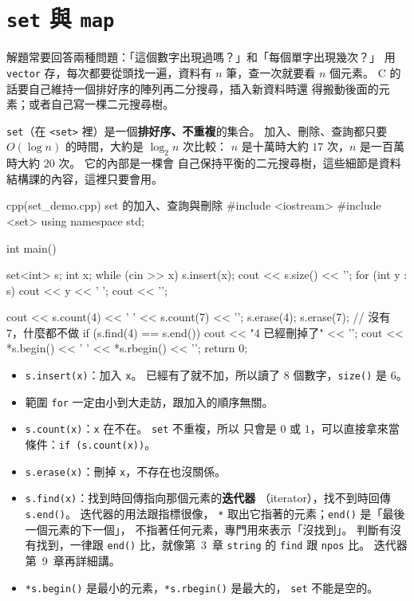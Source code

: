 \section{\texttt{set} 與 \texttt{map}}
\label{sec:map-set}

解題常要回答兩種問題：「這個數字出現過嗎？」和「每個單字出現幾次？」
用 \texttt{vector} 存，每次都要從頭找一遍，資料有 $n$ 筆，查一次就要看
$n$ 個元素。 C 的話要自己維持一個排好序的陣列再二分搜尋，插入新資料時還
得搬動後面的元素；或者自己寫一棵二元搜尋樹。

\texttt{set}（在 \texttt{<set>} 裡）是一個\textbf{排好序、不重複}的集合。
加入、刪除、查詢都只要 $O(\log n)$ 的時間，大約是 $\log_2 n$ 次比較：
$n$ 是十萬時大約 $17$ 次，$n$ 是一百萬時大約 $20$ 次。 它的內部是一棵會
自己保持平衡的二元搜尋樹，這些細節是資料結構課的內容，這裡只要會用。

\begin{example}[label=ex:set]{cpp}{(set\_demo.cpp) set 的加入、查詢與刪除}
#include <iostream>
#include <set>
using namespace std;

int main() {
    set<int> s;
    int x;
    while (cin >> x) {
        s.insert(x);
    }
    cout << s.size() << '\n';
    for (int y : s) {
        cout << y << ' ';
    }
    cout << '\n';

    cout << s.count(4) << ' ' << s.count(7) << '\n';
    s.erase(4);
    s.erase(7);                  // 沒有 7，什麼都不做
    if (s.find(4) == s.end()) {
        cout << "4 已經刪掉了" << '\n';
    }
    cout << *s.begin() << ' ' << *s.rbegin() << '\n';
    return 0;
}
\end{example}


\begin{itemize}
\item \texttt{s.insert(x)}：加入 \texttt{x}。 已經有了就不加，所以讀了
$8$ 個數字，\texttt{size()} 是 $6$。
\item 範圍 \texttt{for} 一定由小到大走訪，跟加入的順序無關。
\item \texttt{s.count(x)}：\texttt{x} 在不在。 \texttt{set} 不重複，所以
只會是 $0$ 或 $1$，可以直接拿來當條件：\texttt{if (s.count(x))}。
\item \texttt{s.erase(x)}：刪掉 \texttt{x}，不存在也沒關係。
\item \texttt{s.find(x)}：找到時回傳指向那個元素的\textbf{迭代器}
（iterator），找不到時回傳 \texttt{s.end()}。 迭代器的用法跟指標很像，
\texttt{*} 取出它指著的元素；\texttt{end()} 是「最後一個元素的下一個」，
不指著任何元素，專門用來表示「沒找到」。 判斷有沒有找到，一律跟
\texttt{end()} 比，就像第~3~章 \texttt{string} 的 \texttt{find} 跟
\texttt{npos} 比。 迭代器第~9~章再詳細講。
\item \texttt{*s.begin()} 是最小的元素，\texttt{*s.rbegin()} 是最大的，
\texttt{set} 不能是空的。
\end{itemize}

